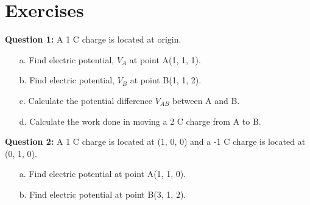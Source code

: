 \documentclass[12pt,a4paper]{article}
\begin{document}
\section{Exercises}
\noindent\textbf{Question 1:} A 1 C charge is located at origin.
\begin{itemize}
\item[a.] Find electric potential, $V_A$ at point A(1, 1, 1).
\item[b.] Find electric potential, $V_B$ at point B(1, 1, 2).
\item[c.] Calculate the potential difference $V_{AB}$ between A and B.
\item[d.] Calculate the work done in moving a 2 C charge from A to B.
\end{itemize}
\noindent\textbf{Question 2:} A 1 C charge is located at (1, 0, 0) and a -1 C charge is located at (0, 1, 0).
\begin{itemize}
\item[a.] Find electric potential at point A(1, 1, 0).
\item[b.] Find electric potential at point B(3, 1, 2).
\end{itemize}
%
%
\end{document}
